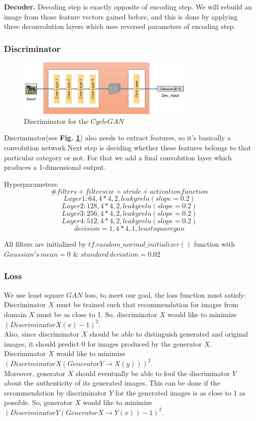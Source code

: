 \documentclass[journal]{IEEEtran}
\begin{document}
\textbf{Decoder.}
Decoding step is exactly opposite of encoding step. We will rebuild an image from those feature vectors gained before, and this is done by applying three deconvolution layers which uses reversed parameters of encoding step.

\subsubsection{Discriminator}
\begin{figure}[htbp]
	\centering
	\includegraphics[width=8.5cm]{fig/Discriminator.jpg}
	\caption{Discriminator for the $CycleGAN$}
	\label{fig:Discriminator}
\end{figure}

Discriminator(see \textbf{Fig. \ref{fig:Discriminator}}) also needs to extract features, so it’s basically a convolution network.Next step is deciding whether these features belongs to that particular category or not. For that we add a final convolution layer which produces a 1-dimensional output.

Hyperparameters: $$\#filters + filter size + stride + activation function$$
$$Layer1: 64, 4*4, 2, leakyrelu (slope=0.2)$$
$$Layer2: 128, 4*4, 2, leakyrelu (slope=0.2)$$
$$Layer3: 256, 4*4, 2, leakyrelu (slope=0.2)$$
$$Layer4: 512, 4*4, 2, leakyrelu (slope=0.2)$$
$$decision = 1, 4*4, 1, least square gan$$

All filters are initialized by $tf.random\_normal\_initializer()$ function with $Gaussian's\, mean=0$ \& $standard\, deviation=0.02$

\subsubsection{Loss} 
We use least square $GAN$ loss, to meet our goal, the loss function must satisfy:
Discriminator $X$ must be trained such that recommendation for images from domain $X$ must be as close to 1. So, discriminator $X$ would like to minimize $(Discriminator X(x)-1)^2$.\\
Also, since discriminator $X$ should be able to distinguish generated and original images, it should predict 0 for images produced by the generator $X$. Discriminator $X$ would like to minimize $(Discriminator X (Generator Y\rightarrow X(y)))^2$.\\
Moreover, generator $X$ should eventually be able to fool the discriminator $Y$ about the authenticity of its generated images. This can be done if the recommendation by discriminator $Y$ for the generated images is as close to 1 as possible. So, generator $X$ would like to minimize $(Discriminator Y (Generator X\rightarrow Y(x))-1)^2$.
\end{document}
